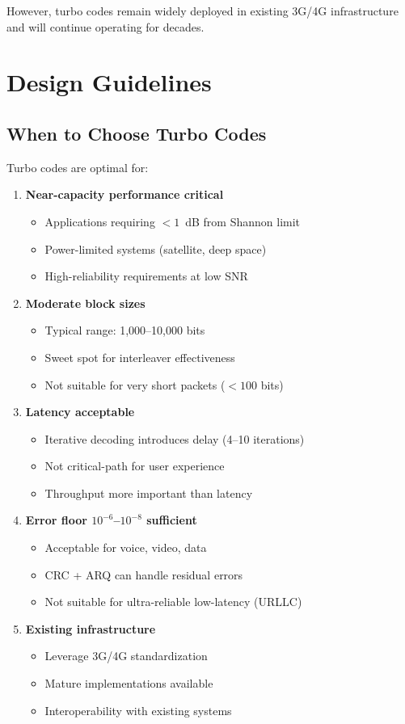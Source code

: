 However, turbo codes remain widely deployed in existing 3G/4G infrastructure and will continue operating for decades.

\section{Design Guidelines}

\subsection{When to Choose Turbo Codes}

Turbo codes are optimal for:

\begin{enumerate}
\item \textbf{Near-capacity performance critical}
  \begin{itemize}
  \item Applications requiring $< 1$~dB from Shannon limit
  \item Power-limited systems (satellite, deep space)
  \item High-reliability requirements at low SNR
  \end{itemize}

\item \textbf{Moderate block sizes}
  \begin{itemize}
  \item Typical range: 1,000--10,000 bits
  \item Sweet spot for interleaver effectiveness
  \item Not suitable for very short packets ($< 100$ bits)
  \end{itemize}

\item \textbf{Latency acceptable}
  \begin{itemize}
  \item Iterative decoding introduces delay (4--10 iterations)
  \item Not critical-path for user experience
  \item Throughput more important than latency
  \end{itemize}

\item \textbf{Error floor $10^{-6}$--$10^{-8}$ sufficient}
  \begin{itemize}
  \item Acceptable for voice, video, data
  \item CRC + ARQ can handle residual errors
  \item Not suitable for ultra-reliable low-latency (URLLC)
  \end{itemize}

\item \textbf{Existing infrastructure}
  \begin{itemize}
  \item Leverage 3G/4G standardization
  \item Mature implementations available
  \item Interoperability with existing systems
  \end{itemize}
\end{enumerate}

